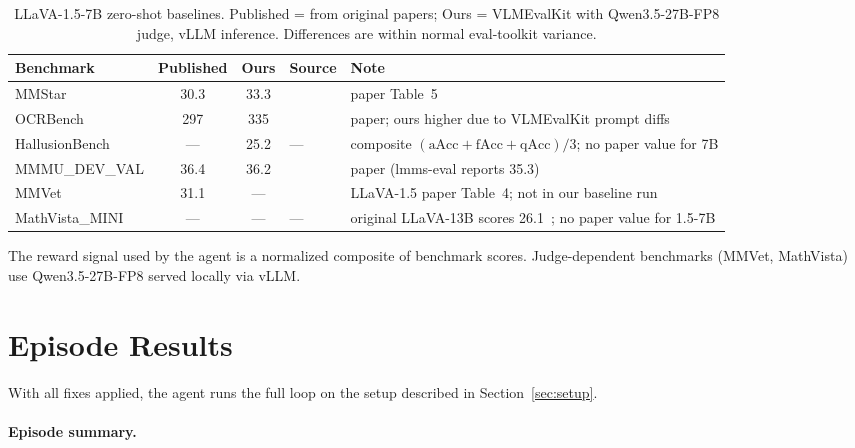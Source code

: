 \begin{table}[H]
\centering
\small
\caption{LLaVA-1.5-7B zero-shot baselines. Published = from original papers; Ours = VLMEvalKit with Qwen3.5-27B-FP8 judge, vLLM inference. Differences are within normal eval-toolkit variance.}
\label{tab:judge-sanity}
\begin{tabular}{lccll}
\toprule
\textbf{Benchmark} & \textbf{Published} & \textbf{Ours} & \textbf{Source} & \textbf{Note} \\
\midrule
MMStar & 30.3 & 33.3 & \cite{chen2024mmstar} & paper Table~5 \\
OCRBench & 297 & 335 & \cite{liu2023ocrbench} & paper; ours higher due to VLMEvalKit prompt diffs \\
HallusionBench & --- & 25.2 & --- & composite $(\text{aAcc}+\text{fAcc}+\text{qAcc})/3$; no paper value for 7B \\
MMMU\_DEV\_VAL & 36.4 & 36.2 & \cite{yue2024mmmu} & paper (lmms-eval reports 35.3) \\
MMVet & 31.1 & --- & \cite{liu2024llava15} & LLaVA-1.5 paper Table~4; not in our baseline run \\
MathVista\_MINI & --- & --- & --- & original LLaVA-13B scores 26.1~\cite{lu2024mathvista}; no paper value for 1.5-7B \\
\bottomrule
\end{tabular}
\end{table}

\noindent The reward signal used by the agent is a normalized composite of benchmark scores. Judge-dependent benchmarks (MMVet, MathVista) use Qwen3.5-27B-FP8 served locally via vLLM.



\newpage
\section{Episode Results}

With all fixes applied, the agent runs the full loop on the setup described in Section~\ref{sec:setup}.


\paragraph{Episode summary.}

